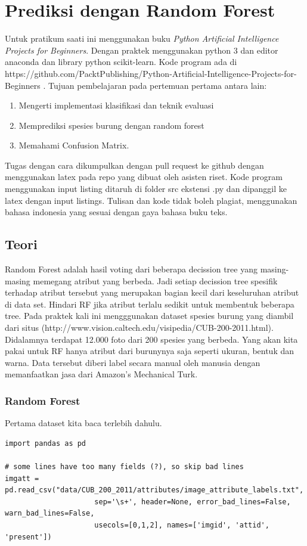 \chapter{Prediksi dengan Random Forest}

Untuk pratikum saati ini menggunakan buku \textit{Python Artificial Intelligence Projects for Beginners}\cite{eckroth2018python}. Dengan praktek menggunakan python 3 dan editor anaconda dan library python scikit-learn.
Kode program ada di https://github.com/PacktPublishing/Python-Artificial-Intelligence-Projects-for-Beginners .
Tujuan pembelajaran pada pertemuan pertama antara lain:
\begin{enumerate}
\item
Mengerti implementasi klasifikasi dan teknik evaluasi
\item
Memprediksi spesies burung dengan random forest
\item
Memahami Confusion Matrix.
\end{enumerate}
Tugas dengan cara dikumpulkan dengan pull request ke github dengan menggunakan latex pada repo yang dibuat oleh asisten riset. Kode program menggunakan input listing ditaruh di folder src ekstensi .py dan dipanggil ke latex dengan input listings. Tulisan dan kode tidak boleh plagiat, menggunakan bahasa indonesia yang sesuai dengan gaya bahasa buku teks.

\section{Teori}
Random Forest adalah hasil voting dari beberapa decission tree yang masing-masing memegang atribut yang berbeda. Jadi setiap decission tree spesifik terhadap atribut tersebut yang merupakan bagian kecil dari keseluruhan atribut di data set. Hindari RF jika atribut terlalu sedikit untuk membentuk beberapa tree. Pada praktek kali ini mengggunakan dataset spesies burung yang diambil dari situs 
(http://www.vision.caltech.edu/visipedia/CUB-200-2011.html). Didalamnya terdapat 12.000 foto dari 200 spesies yang berbeda. Yang akan kita pakai untuk RF hanya atribut dari burunynya saja seperti ukuran, bentuk dan warna. Data tersebut diberi label secara manual oleh manusia dengan memanfaatkan jasa dari Amazon's Mechanical Turk.

\subsection{Random Forest}
Pertama dataset kita baca terlebih dahulu.
\begin{lstlisting}[caption=Membaca data file txt,label={lst:fungsisederhana}]
import pandas as pd

# some lines have too many fields (?), so skip bad lines
imgatt = pd.read_csv("data/CUB_200_2011/attributes/image_attribute_labels.txt",
                     sep='\s+', header=None, error_bad_lines=False, warn_bad_lines=False,
                     usecols=[0,1,2], names=['imgid', 'attid', 'present'])

\end{lstlisting}


